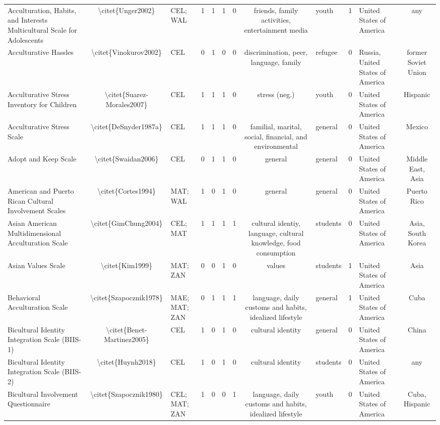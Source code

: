 \begin{longtable}[l]{lclclclclclc}
Acculturation, Habits, and Interests Multicultural Scale for Adolescents & \textbackslash{}citet\{Unger2002\} & CEL; WAL & 1 & 1 & 1 & 0 & friends, family activities, entertainment media & youth & 1 & United States of America & any\\
Acculturative Hassles & \textbackslash{}citet\{Vinokurov2002\} & CEL & 0 & 1 & 0 & 0 & discrimination, peer, language, family & refugee & 0 & Russia, United States of America & former Soviet Union\\
Acculturative Stress Inventory for Children & \textbackslash{}citet\{Suarez-Morales2007\} & CEL & 1 & 1 & 1 & 0 & stress (neg.) & youth & 0 & United States of America & Hispanic\\
Acculturative Stress Scale & \textbackslash{}citet\{DeSnyder1987a\} & CEL & 1 & 1 & 1 & 0 & familial, marital, social, financial, and environmental & general & 0 & United States of America & Mexico\\
Adopt and Keep Scale & \textbackslash{}citet\{Swaidan2006\} & CEL & 0 & 1 & 1 & 0 & general & general & 0 & United States of America & Middle East, Asia\\
American and Puerto Rican Cultural Involvement Scales & \textbackslash{}citet\{Cortes1994\} & MAT; WAL & 1 & 0 & 1 & 0 & general & general & 0 & United States of America & Puerto Rico\\
Asian American Multidimensional Acculturation Scale & \textbackslash{}citet\{GimChung2004\} & CEL; MAT & 1 & 1 & 1 & 1 & cultural identiy, language, cultural knowledge, food consumption & students & 0 & United States of America & Asia, South Korea\\
Asian Values Scale & \textbackslash{}citet\{Kim1999\} & MAT; ZAN & 0 & 0 & 1 & 0 & values & students & 1 & United States of America & Asia\\
Behavioral Acculturation Scale & \textbackslash{}citet\{Szapocznik1978\} & MAE; MAT; ZAN & 0 & 1 & 1 & 1 & language, daily customs and habits, idealized lifestyle & general & 1 & United States of America & Cuba\\
Bicultural Identity Integration Scale (BIIS-1) & \textbackslash{}citet\{Benet-Martinez2005\} & CEL & 1 & 0 & 1 & 0 & cultural identity & general & 0 & United States of America & China\\
Bicultural Identity Integration Scale (BIIS-2) & \textbackslash{}citet\{Huynh2018\} & CEL & 1 & 0 & 1 & 0 & cultural identity & students & 0 & United States of America & any\\
Bicultural Involvement Questionnaire & \textbackslash{}citet\{Szapocznik1980\} & CEL; MAT; ZAN & 1 & 0 & 0 & 1 & language, daily customs and habits, idealized lifestyle & youth & 0 & United States of America & Cuba, Hispanic\\

\end{longtable}
